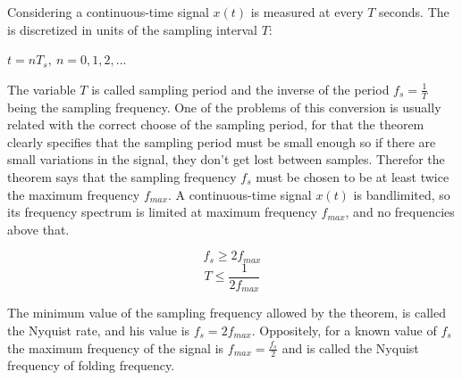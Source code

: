 Considering a continuous-time signal $x(t)$ is measured at every $T$ seconds. The is discretized in units of the sampling interval $T$:
\begin{center}
    $t = nT_s,\> n = 0, 1, 2, ...$
\end{center}
The variable $T$ is called sampling period and the inverse of the period $f_s=\frac{1}{T}$ being the sampling frequency. One of the problems of this conversion is usually related with the correct choose of the sampling period, for that the theorem clearly specifies that the sampling period must be small enough so if there are small variations in the signal, they don't get lost between samples. Therefor the theorem says that the sampling frequency $f_s$ must be chosen to be  at least twice the maximum frequency $f_{max}$. A continuous-time signal $x(t)$ is bandlimited, so its frequency spectrum is limited at maximum frequency $f_{max}$, and no frequencies above that.

\begin{equation} \label{eq:sampFreq}
       f_s \geq 2f_{max}
\end{equation}
\begin{equation} \label{eq:sampPeriod}
    T \leq \frac{1}{2f_{max}}
\end{equation}

The minimum value of the sampling frequency allowed by the theorem, is called the Nyquist rate, and his value is $f_s = 2f_{max}$. Oppositely, for a known value of $f_s$ the maximum frequency of the signal is $f_{max}=\frac{f_s}{2}$ and is called the Nyquist frequency of folding frequency.

